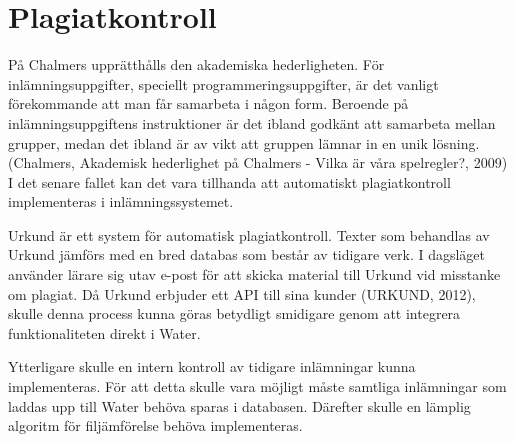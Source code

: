 \section{Plagiatkontroll}
På Chalmers upprätthålls den akademiska hederligheten. För inlämningsuppgifter, speciellt programmeringsuppgifter, är det vanligt förekommande att man får samarbeta i någon form. Beroende på inlämningsuppgiftens instruktioner är det ibland godkänt att samarbeta mellan grupper, medan det ibland är av vikt att gruppen lämnar in en unik lösning. (Chalmers, Akademisk hederlighet på Chalmers - Vilka är våra spelregler?, 2009) I det senare fallet kan det vara tillhanda att automatiskt plagiatkontroll implementeras i inlämningssystemet.

Urkund är ett system för automatisk plagiatkontroll. Texter som behandlas av Urkund jämförs med en bred databas som består av tidigare verk. I dagsläget använder lärare sig utav e-post för att skicka material till Urkund vid misstanke om plagiat. Då Urkund erbjuder ett API till sina kunder (URKUND, 2012), skulle denna process kunna göras betydligt smidigare genom att integrera funktionaliteten direkt i Water.

Ytterligare skulle en intern kontroll av tidigare inlämningar kunna implementeras. För att detta skulle vara möjligt måste samtliga inlämningar som laddas upp till Water behöva sparas i databasen. Därefter skulle en lämplig algoritm för filjämförelse behöva implementeras.
